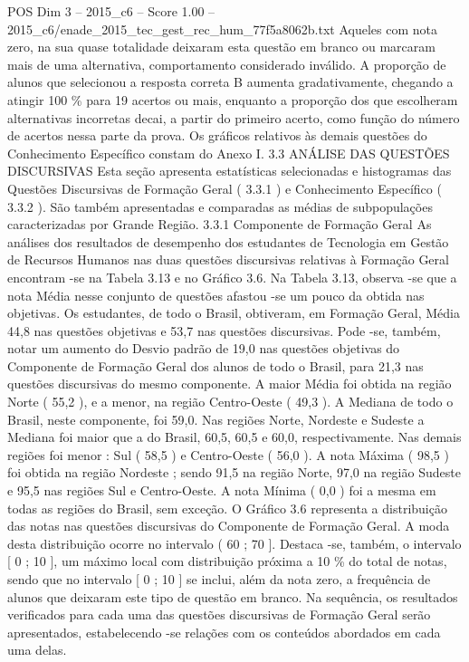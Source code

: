 \begin{textsample}{POS Dim 3 – 2015\_c6 – Score 1.00 – 2015\_c6/enade\_2015\_tec\_gest\_rec\_hum\_77f5a8062b.txt}
Aqueles com nota zero, na sua quase totalidade deixaram esta questão em branco ou marcaram mais de uma alternativa, comportamento considerado inválido.
A proporção de alunos que selecionou a resposta correta B aumenta gradativamente, chegando a atingir 100 \% para 19 acertos ou mais, enquanto a proporção dos que escolheram alternativas incorretas decai, a partir do primeiro acerto, como função do número de acertos nessa parte da prova.
Os gráficos relativos às demais questões do Conhecimento Específico constam do Anexo I. 3.3 ANÁLISE DAS QUESTÕES DISCURSIVAS Esta seção apresenta estatísticas selecionadas e histogramas das Questões Discursivas de Formação Geral ( 3.3.1 ) e Conhecimento Específico ( 3.3.2 ).
São também apresentadas e comparadas as médias de subpopulações caracterizadas por Grande Região. 3.3.1 Componente de Formação Geral As análises dos resultados de desempenho dos estudantes de Tecnologia em Gestão de Recursos Humanos nas duas questões discursivas relativas à Formação Geral encontram -se na Tabela 3.13 e no Gráfico 3.6.
Na Tabela 3.13, observa -se que a nota Média nesse conjunto de questões afastou -se um pouco da obtida nas objetivas.
Os estudantes, de todo o Brasil, obtiveram, em Formação Geral, Média 44,8 nas questões objetivas e 53,7 nas questões discursivas.
Pode -se, também, notar um aumento do Desvio padrão de 19,0 nas questões objetivas do Componente de Formação Geral dos alunos de todo o Brasil, para 21,3 nas questões discursivas do mesmo componente.
A maior Média foi obtida na região Norte ( 55,2 ), e a menor, na região Centro-Oeste ( 49,3 ).
A Mediana de todo o Brasil, neste componente, foi 59,0.
Nas regiões Norte, Nordeste e Sudeste a Mediana foi maior que a do Brasil, 60,5, 60,5 e 60,0, respectivamente.
Nas demais regiões foi menor : Sul ( 58,5 ) e Centro-Oeste ( 56,0 ).
A nota Máxima ( 98,5 ) foi obtida na região Nordeste ; sendo 91,5 na região Norte, 97,0 na região Sudeste e 95,5 nas regiões Sul e Centro-Oeste.
A nota Mínima ( 0,0 ) foi a mesma em todas as regiões do Brasil, sem exceção.
O Gráfico 3.6 representa a distribuição das notas nas questões discursivas do Componente de Formação Geral.
A moda desta distribuição ocorre no intervalo ( 60 ; 70 ].
Destaca -se, também, o intervalo [ 0 ; 10 ], um máximo local com distribuição próxima a 10 \% do total de notas, sendo que no intervalo [ 0 ; 10 ] se inclui, além da nota zero, a frequência de alunos que deixaram este tipo de questão em branco.
Na sequência, os resultados verificados para cada uma das questões discursivas de Formação Geral serão apresentados, estabelecendo -se relações com os conteúdos abordados em cada uma delas.

\end{textsample}
